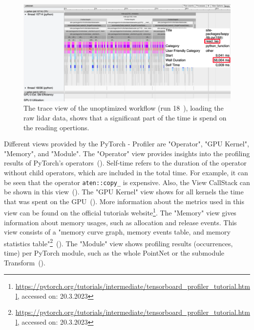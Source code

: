 \documentclass[12pt, a4paper, hidelinks]{article}
\begin{document}
\begin{figure}[H]
\centering
\includegraphics[width=1\textwidth]{./assets/scap_gtx1080_profiler-torch_sample-points_14650750_trace-view-laspy}
\caption[PyTorch - Profiler: Trace View of run 18]{The trace view of the unoptimized workflow (run 18~), loading the raw lidar data, shows that a significant part of the time is spend on the reading opertions.}
\label{fig:scap_gtx1080_profiler-torch_sample-points_14650750_trace-view-laspy}
\end{figure}

Different views provided by the PyTorch - Profiler are "Operator", "GPU Kernel", "Memory", and "Module".
The "Operator" view provides insights into the profiling results of PyTorch's operators~(). Self-time refers to the duration of the operator without child operators, which are included in the total time. For example, it can be seen that the operator \texttt{aten::copy\_} is expensive. Also, the View CallStack can be shown in this view~().
The "GPU Kernel" view shows for all kernels the time that was spent on the \ac{GPU}~(). More information about the metrics used in this view can be found on the official tutorials website\footnote{\url{https://pytorch.org/tutorials/intermediate/tensorboard_profiler_tutorial.html}, accessed on: 20.3.2023}.
The "Memory" view gives information about memory usages, such as allocation and release events. This view consists of a "memory curve graph, memory events table, and memory statistics table"\footnote{\url{https://pytorch.org/tutorials/intermediate/tensorboard_profiler_tutorial.html}, accessed on: 20.3.2023}~().
The "Module" view shows profiling results (occurrences, time) per PyTorch module, such as the whole PointNet or the submodule Transform~().
\end{document}
